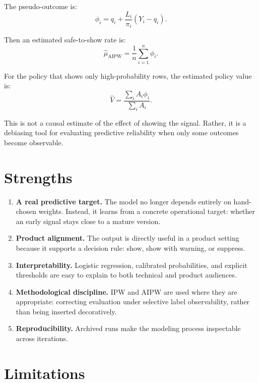 \documentclass[11pt]{article}
\begin{document}
The pseudo-outcome is:
\[
\phi_i = q_i + \frac{L_i}{\pi_i}(Y_i - q_i).
\]

Then an estimated safe-to-show rate is:
\[
\hat{\mu}_{\text{AIPW}} = \frac{1}{n}\sum_{i=1}^n \phi_i.
\]

For the policy that shows only high-probability rows, the estimated policy value is:
\[
\hat{V} = \frac{\sum_i A_i \phi_i}{\sum_i A_i}.
\]

This is not a causal estimate of the effect of showing the signal. Rather, it is a debiasing tool for evaluating predictive reliability when only some outcomes become observable.

\section{Strengths}

\begin{enumerate}[leftmargin=1.5em]
    \item \textbf{A real predictive target.} The model no longer depends entirely on hand-chosen weights. Instead, it learns from a concrete operational target: whether an early signal stays close to a mature version.
    \item \textbf{Product alignment.} The output is directly useful in a product setting because it supports a decision rule: show, show with warning, or suppress.
    \item \textbf{Interpretability.} Logistic regression, calibrated probabilities, and explicit thresholds are easy to explain to both technical and product audiences.
    \item \textbf{Methodological discipline.} IPW and AIPW are used where they are appropriate: correcting evaluation under selective label observability, rather than being inserted decoratively.
    \item \textbf{Reproducibility.} Archived runs make the modeling process inspectable across iterations.
\end{enumerate}

\section{Limitations}
\end{document}
